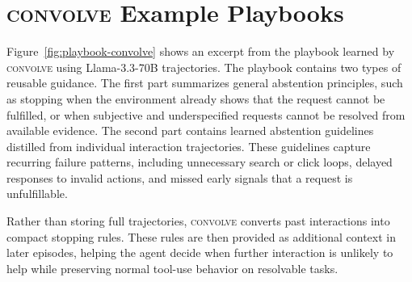 \documentclass{llmxive}
\providecommand{\method}{\textsc{convolve}\xspace}
\begin{document}
\section{\method Example Playbooks}
\label{app:playbook}

Figure~\ref{fig:playbook-convolve} shows an excerpt from the playbook learned by \method using Llama-3.3-70B trajectories. The playbook contains two types of reusable guidance. The first part summarizes general abstention principles, such as stopping when the environment already shows that the request cannot be fulfilled, or when subjective and underspecified requests cannot be resolved from available evidence. The second part contains learned abstention guidelines distilled from individual interaction trajectories. These guidelines capture recurring failure patterns, including unnecessary search or click loops, delayed responses to invalid actions, and missed early signals that a request is unfulfillable.

Rather than storing full trajectories, \method converts past interactions into compact stopping rules. These rules are then provided as additional context in later episodes, helping the agent decide when further interaction is unlikely to help while preserving normal tool-use behavior on resolvable tasks.
\end{document}
